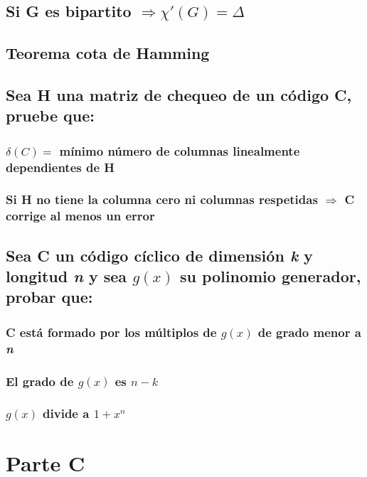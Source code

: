 \documentclass[12pt,a4paper]{report}
\begin{document}
	
	\section{Si G es bipartito $\Rightarrow \chi '(G) = \Delta $}

	
	\section{Teorema cota de Hamming}
	
	
	\section{Sea H una matriz de chequeo de un código C, pruebe que:}
	
		\subsection{$\delta (C) =$ mínimo número de columnas linealmente dependientes de H}
		
		\subsection{Si H no tiene la columna cero ni columnas respetidas $\Rightarrow$ C corrige al menos un error}


	\section{Sea C un código cíclico de dimensión \textit{k} y longitud \textit{n} y sea $g(x)$ su polinomio generador, probar que:}
	
		\subsection{C está formado por los múltiplos de $g(x)$ de grado menor a \textit{n}}
		
		\subsection{El grado de $g(x)$ es $n-k$}
		
		\subsection{$g(x)$ divide a $1+x^{n}$}
		
		

\chapter{Parte C}
\end{document}
